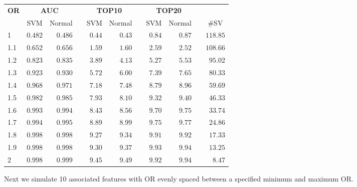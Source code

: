 \documentclass{article}\usepackage[]{graphicx}\usepackage[]{color}
\begin{document}
%
\begin{table}[H]
\begin{center}
\begin{tabular}{lrrcrrcrrcr}
\hline\hline
\multicolumn{1}{l}{\bfseries OR}&\multicolumn{2}{c}{\bfseries AUC}&\multicolumn{1}{c}{\bfseries }&\multicolumn{2}{c}{\bfseries TOP10}&\multicolumn{1}{c}{\bfseries }&\multicolumn{2}{c}{\bfseries TOP20}&\multicolumn{1}{c}{\bfseries }&\multicolumn{1}{c}{\bfseries }\tabularnewline
\cline{2-3} \cline{5-6} \cline{8-9}
\multicolumn{1}{l}{}&\multicolumn{1}{c}{SVM}&\multicolumn{1}{c}{Normal}&\multicolumn{1}{c}{}&\multicolumn{1}{c}{SVM}&\multicolumn{1}{c}{Normal}&\multicolumn{1}{c}{}&\multicolumn{1}{c}{SVM}&\multicolumn{1}{c}{Normal}&\multicolumn{1}{c}{}&\multicolumn{1}{c}{\#SV}\tabularnewline
\hline
1&$0.482$&$0.486$&&$0.44$&$0.43$&&$0.84$&$0.87$&&$118.85$\tabularnewline
1.1&$0.652$&$0.656$&&$1.59$&$1.60$&&$2.59$&$2.52$&&$108.66$\tabularnewline
1.2&$0.823$&$0.835$&&$3.89$&$4.13$&&$5.27$&$5.53$&&$ 95.02$\tabularnewline
1.3&$0.923$&$0.930$&&$5.72$&$6.00$&&$7.39$&$7.65$&&$ 80.33$\tabularnewline
1.4&$0.968$&$0.971$&&$7.18$&$7.48$&&$8.79$&$8.96$&&$ 59.69$\tabularnewline
1.5&$0.982$&$0.985$&&$7.93$&$8.10$&&$9.32$&$9.40$&&$ 46.33$\tabularnewline
1.6&$0.993$&$0.994$&&$8.43$&$8.56$&&$9.70$&$9.75$&&$ 33.74$\tabularnewline
1.7&$0.994$&$0.995$&&$8.89$&$8.99$&&$9.75$&$9.77$&&$ 24.86$\tabularnewline
1.8&$0.998$&$0.998$&&$9.27$&$9.34$&&$9.91$&$9.92$&&$ 17.33$\tabularnewline
1.9&$0.998$&$0.998$&&$9.30$&$9.37$&&$9.93$&$9.94$&&$ 13.25$\tabularnewline
2&$0.998$&$0.999$&&$9.45$&$9.49$&&$9.92$&$9.94$&&$  8.47$\tabularnewline
\hline
\end{tabular}
\end{center}
\end{table}





Next we simulate 10 associated features with OR evenly spaced between a specified minimum and maximum OR.
\end{document}
